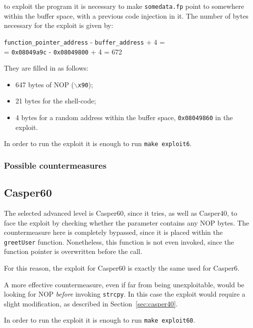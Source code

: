 to exploit the program it is necessary to make \texttt{somedata.fp} point to somewhere within the buffer space, with a previous code injection in it. The number of bytes necessary for the exploit is given by:

\begin{center}
	\texttt{function\_pointer\_address} - \texttt{buffer\_address} + 4 = \\
	= \texttt{0x08049a9c} - \texttt{0x08049800} + 4 = 672
\end{center}

They are filled in as follows:
\begin{itemize}
	\item 647 bytes of NOP (\texttt{$\backslash$x90});
	\item 21 bytes for the shell-code;
	\item 4 bytes for a random address within the buffer space, \texttt{0x08049860} in the exploit.
\end{itemize}

In order to run the exploit it is enough to run \texttt{make exploit6}.

\subsubsection{Possible countermeasures}

\subsection{Casper60}
The selected advanced level is Casper60, since it tries, as well as Casper40, to face the exploit by checking whether the parameter contains any NOP bytes. The countermeasure here is completely bypassed, since it is placed within the \texttt{greetUser} function. Nonetheless, this function is not even invoked, since the function pointer is overwritten before the call. 

For this reason, the exploit for Casper60 is exactly the same used for Casper6. 

A more effective countermeasure, even if far from being unexploitable, would be looking for NOP \textit{before} invoking \texttt{strcpy}. In this case the exploit would require a slight modification, as described in Section~\ref{sec:casper40}.

In order to run the exploit it is enough to run \texttt{make exploit60}.
